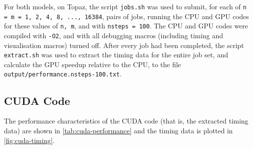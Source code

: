 \documentclass{article}
\newcommand{\lilf}[1]{\lstinline[style=ff]{#1}}
\begin{document}
For both models, on Topaz, the script \lilf{jobs.sh} was used to submit, for
each of \lstinline{n = m = 1, 2, 4, 8, ..., 16384}, pairs of jobs, running the
CPU and GPU codes for these values of \lstinline{n, m}, and with
\lstinline{nsteps = 100}.
The CPU and GPU codes were compiled with \lstinline{-O2}, and with all debugging
macros (including timing and visualisation macros) turned off.
After every job had been completed, the script \lilf{extract.sh} was used to
extract the timing data for the entire job set, and calculate the GPU speedup
relative to the CPU, to the file \lilf{output/performance.nsteps-100.txt}.

\subsection{CUDA Code}
\label{sec:cuda-code}

The performance characteristics of the CUDA code (that is, the extracted timing
data) are shown in \autoref{tab:cuda-performance} and the timing data is plotted
in \autoref{fig:cuda-timing}.

\begin{table}[h]
  \begin{center}
    \label{tab:cuda-performance}
    \caption{
      Performance characteristics of CUDA code, compiled with
      \lstinline[language=bash]{-02}, and with debugging statements turned off.
      All times are presented in units of \si{\ms}.
    }

  \end{center}
\end{table}
\end{document}
